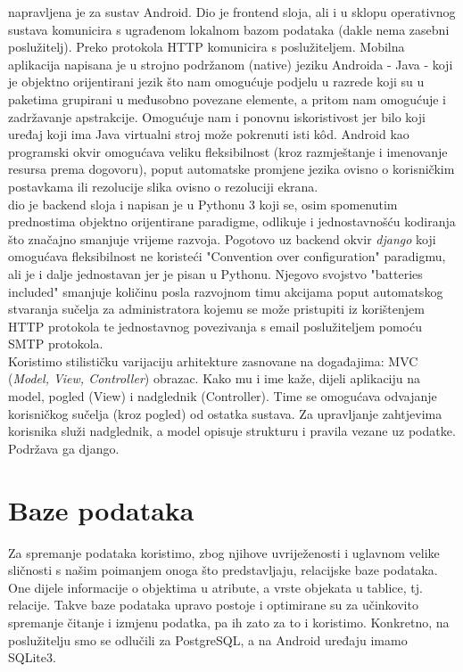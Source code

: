      napravljena je za sustav Android. Dio je frontend sloja, ali i u sklopu operativnog sustava komunicira s ugrađenom lokalnom bazom podataka (dakle nema zasebni poslužitelj). Preko protokola HTTP komunicira s poslužiteljem. Mobilna aplikacija napisana je u strojno podržanom (native) jeziku Androida - Java - koji je objektno orijentirani jezik što nam omogućuje podjelu u razrede koji su u paketima grupirani u međusobno povezane elemente, a pritom nam omogućuje i zadržavanje apstrakcije. Omogućuje nam i ponovnu iskoristivost jer bilo koji uređaj koji ima Java virtualni stroj može pokrenuti isti kôd. Android kao programski okvir omogućava veliku fleksibilnost (kroz razmještanje i imenovanje resursa prema dogovoru), poput automatske promjene jezika ovisno o korisničkim postavkama ili rezolucije slika ovisno o rezoluciji ekrana. \\
     dio je backend sloja i napisan je u Pythonu 3 koji se, osim spomenutim prednostima objektno orijentirane paradigme, odlikuje i jednostavnošću kodiranja što značajno smanjuje vrijeme razvoja. Pogotovo uz backend okvir \textit{django} koji omogućava fleksibilnost ne koristeći "Convention over configuration" paradigmu, ali je i dalje jednostavan jer je pisan u Pythonu. Njegovo svojstvo "batteries included" smanjuje količinu posla razvojnom timu akcijama poput automatskog stvaranja sučelja za administratora kojemu se može pristupiti iz  korištenjem HTTP protokola te jednostavnog povezivanja s email poslužiteljem pomoću SMTP protokola. \\
    Koristimo stilističku varijaciju arhitekture zasnovane na događajima: MVC (\textit{Model, View, Controller}) obrazac. Kako mu i ime kaže, dijeli aplikaciju na model, pogled (View) i nadglednik (Controller). Time se omogućava odvajanje korisničkog sučelja (kroz pogled) od ostatka sustava. Za upravljanje zahtjevima korisnika služi nadglednik, a model opisuje strukturu i pravila vezane uz podatke. Podržava ga django. \\
  
	
		

		

				
		\section{Baze podataka}
		
		Za spremanje podataka koristimo, zbog njihove uvriježenosti i uglavnom velike sličnosti s našim poimanjem onoga što predstavljaju, relacijske baze podataka. One dijele informacije o objektima u atribute, a vrste objekata u tablice, tj. relacije. Takve baze podataka upravo postoje i optimirane su za učinkovito spremanje čitanje i izmjenu podatka, pa ih zato za to i koristimo. Konkretno, na poslužitelju smo se odlučili za PostgreSQL, a na Android uređaju imamo SQLite3. \\
		
